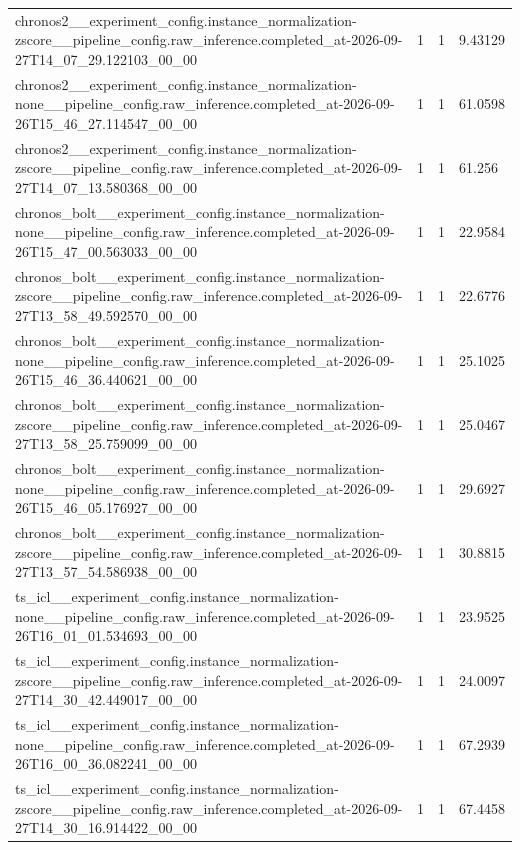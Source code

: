 \begin{tabular}{llll}
chronos2\_\_experiment\_config.instance\_normalization-zscore\_\_pipeline\_config.raw\_inference.completed\_at-2026-09-27T14\_07\_29.122103\_00\_00 & 1 & 1 & 9.43129 \\
chronos2\_\_experiment\_config.instance\_normalization-none\_\_pipeline\_config.raw\_inference.completed\_at-2026-09-26T15\_46\_27.114547\_00\_00 & 1 & 1 & 61.0598 \\
chronos2\_\_experiment\_config.instance\_normalization-zscore\_\_pipeline\_config.raw\_inference.completed\_at-2026-09-27T14\_07\_13.580368\_00\_00 & 1 & 1 & 61.256 \\
chronos\_bolt\_\_experiment\_config.instance\_normalization-none\_\_pipeline\_config.raw\_inference.completed\_at-2026-09-26T15\_47\_00.563033\_00\_00 & 1 & 1 & 22.9584 \\
chronos\_bolt\_\_experiment\_config.instance\_normalization-zscore\_\_pipeline\_config.raw\_inference.completed\_at-2026-09-27T13\_58\_49.592570\_00\_00 & 1 & 1 & 22.6776 \\
chronos\_bolt\_\_experiment\_config.instance\_normalization-none\_\_pipeline\_config.raw\_inference.completed\_at-2026-09-26T15\_46\_36.440621\_00\_00 & 1 & 1 & 25.1025 \\
chronos\_bolt\_\_experiment\_config.instance\_normalization-zscore\_\_pipeline\_config.raw\_inference.completed\_at-2026-09-27T13\_58\_25.759099\_00\_00 & 1 & 1 & 25.0467 \\
chronos\_bolt\_\_experiment\_config.instance\_normalization-none\_\_pipeline\_config.raw\_inference.completed\_at-2026-09-26T15\_46\_05.176927\_00\_00 & 1 & 1 & 29.6927 \\
chronos\_bolt\_\_experiment\_config.instance\_normalization-zscore\_\_pipeline\_config.raw\_inference.completed\_at-2026-09-27T13\_57\_54.586938\_00\_00 & 1 & 1 & 30.8815 \\
ts\_icl\_\_experiment\_config.instance\_normalization-none\_\_pipeline\_config.raw\_inference.completed\_at-2026-09-26T16\_01\_01.534693\_00\_00 & 1 & 1 & 23.9525 \\
ts\_icl\_\_experiment\_config.instance\_normalization-zscore\_\_pipeline\_config.raw\_inference.completed\_at-2026-09-27T14\_30\_42.449017\_00\_00 & 1 & 1 & 24.0097 \\
ts\_icl\_\_experiment\_config.instance\_normalization-none\_\_pipeline\_config.raw\_inference.completed\_at-2026-09-26T16\_00\_36.082241\_00\_00 & 1 & 1 & 67.2939 \\
ts\_icl\_\_experiment\_config.instance\_normalization-zscore\_\_pipeline\_config.raw\_inference.completed\_at-2026-09-27T14\_30\_16.914422\_00\_00 & 1 & 1 & 67.4458 \\

\end{tabular}
